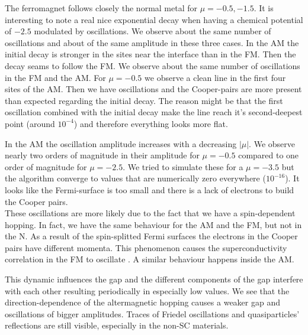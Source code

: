 \documentclass[..\main.tex]{subfile}
\begin{document}
The ferromagnet follows closely the normal metal for $\mu=-0.5,-1.5$. It is interesting to note a real nice exponential
decay when having a chemical potential of $-2.5$ modulated by oscillations. We observe about the same number of oscillations and about of
the same amplitude in these three cases. In the AM the initial decay is stronger in the sites near the 
interface than in the FM. Then the decay seams to follow the FM. We observe about the same number of oscillations in the FM and the AM.
For $\mu=-0.5$ we observe a clean line in the first four sites of the AM. Then we have oscillations and the Cooper-pairs are more present
than expected regarding the initial decay. The reason might be that the first oscillation combined with the initial decay make the line
reach it's second-deepest point (around $10^{-4}$) and therefore everything looks more flat.

In the AM the oscillation amplitude increases with a decreasing $|\mu|$.
We observe nearly two orders of magnitude in their amplitude for $\mu=-0.5$ compared to one order of magnitude for $\mu=-2.5$.
We tried to simulate these for a $\mu=-3.5$ but the algorithm  converge to values that are numerically zero everywhere ($10^{-16}$).
It looks like the Fermi-surface is too small and there is a lack of electrons to build the Cooper pairs.\\
 
These oscillations are more likely due to the fact that we have a spin-dependent hopping. In fact, we have the same behaviour for the AM
and the FM, but not in the N. As a result of the spin-splitted Fermi surfaces the electrons in the Cooper pairs have different momenta.
This phenomenon causes the superconductivity correlation in the FM to oscillate \cite{Jong1995}. A similar behaviour happens inside the AM.

This dynamic influences the gap and the different components of the gap interfere with each other resulting
periodically in especially low values. We see that the direction-dependence of the altermagnetic hopping causes a weaker gap and 
oscillations of bigger amplitudes. Traces of Friedel oscillations and quasiparticles' reflections are still visible, especially in the non-SC materials.\\
\end{document}
